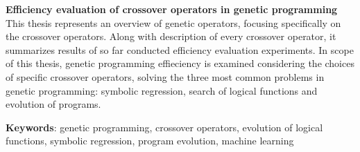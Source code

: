 \textbf{ \large Efficiency evaluation of crossover operators in genetic programming } \\

This thesis represents an overview of genetic operators, focusing specifically on the crossover operators. Along with description of every crossover operator, it summarizes results of so far conducted efficiency evaluation experiments. In scope of this thesis, genetic programming effieciency is examined considering the choices of specific crossover operators, solving the three most common problems in genetic programming: symbolic regression, search of logical functions and evolution of programs.

\textbf{Keywords}: genetic programming, crossover operators, evolution of logical functions, symbolic regression, program evolution, machine learning
